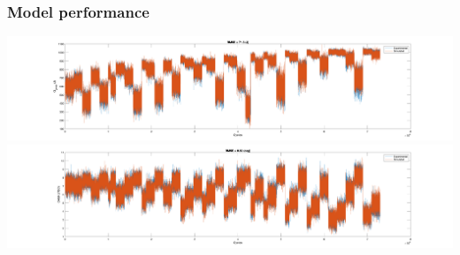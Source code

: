 \documentclass[aspectratio=169, 10pt]{beamer}
\begin{document}
\begin{frame}
\frametitle{Model performance}
\begin{center}
\vspace{-1em}
\includegraphics[trim=150 0 150 0, clip, width=\textwidth]{../Model_Plots/Q_gross_comparison.png}
\includegraphics[trim=150 0 150 0, clip, width=\textwidth]{../Model_Plots/CA50_comparison.png}
\end{center}
\end{frame}
\end{document}
